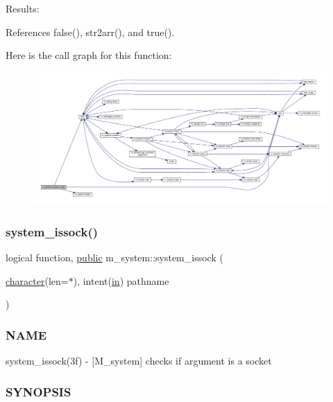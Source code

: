 Results\+: 

References false(), str2arr(), and true().

Here is the call graph for this function\+:
\nopagebreak
\begin{figure}[H]
\begin{center}
\leavevmode
\includegraphics[width=350pt]{namespacem__system_a127bdd84ccd4b52f3f29abbc56af029b_cgraph}
\end{center}
\end{figure}
\mbox{\label{namespacem__system_af6eb5074fe74552bc7a5e7d00f459087}} 
\subsubsection{\texorpdfstring{system\+\_\+issock()}{system\_issock()}}
{\footnotesize\ttfamily logical function, \hyperlink{M__stopwatch_83_8txt_a2f74811300c361e53b430611a7d1769f}{public} m\+\_\+system\+::system\+\_\+issock (\begin{DoxyParamCaption}\item[{\hyperlink{option__stopwatch_83_8txt_abd4b21fbbd175834027b5224bfe97e66}{character}(len=$\ast$), intent(\hyperlink{M__journal_83_8txt_afce72651d1eed785a2132bee863b2f38}{in})}]{pathname }\end{DoxyParamCaption})}



\subsubsection*{N\+A\+ME}

system\+\_\+issock(3f) -\/ \mbox{[}M\+\_\+system\mbox{]} checks if argument is a socket 

\subsubsection*{S\+Y\+N\+O\+P\+S\+IS}

